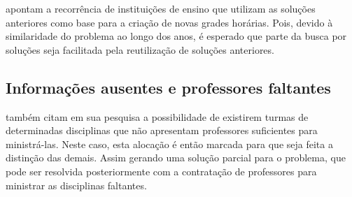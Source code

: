  apontam a recorrência de instituições de ensino que utilizam as soluções anteriores como base para a criação de novas grades horárias. Pois, devido à similaridade do problema ao longo dos anos, é esperado que parte da busca por soluções seja facilitada pela reutilização de soluções anteriores.

\subsection{Informações ausentes e professores faltantes} \label{ssec:ausentes}                            %

 também citam em sua pesquisa a possibilidade de existirem turmas de determinadas disciplinas que não apresentam professores suficientes para ministrá-las. Neste caso, esta alocação é então marcada para que seja feita a distinção das demais. Assim gerando uma solução parcial para o problema, que pode ser resolvida posteriormente com a contratação de professores para ministrar as disciplinas faltantes.
